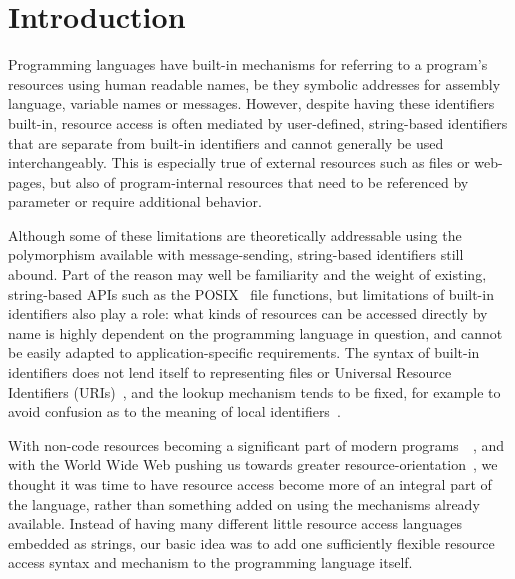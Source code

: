 \documentclass{acm_proc_article-sp}
\begin{document}



\section{Introduction}

Programming languages have built-in mechanisms for 
referring to a program's resources using human readable names, be they symbolic addresses for
assembly language, variable names or messages.   However, despite having these identifiers built-in, resource access
is often mediated by user-defined, string-based identifiers that are separate from built-in identifiers
and cannot generally be used interchangeably.  This is especially true
of external resources such as files or web-pages, but also of program-internal resources that need to
be referenced by parameter or require additional behavior.



Although some of these limitations are theoretically addressable using the polymorphism available with
message-sending, string-based identifiers still abound.
Part of the reason may well be familiarity and the weight of existing, string-based APIs such as the POSIX~\cite{IEEE:POSIX.1-90}
file functions, but
limitations of built-in identifiers also play a role:   what kinds of resources can be accessed directly by name is
highly dependent on the programming language in question, and cannot be easily 
adapted to application-specific requirements.  The syntax of built-in identifiers does not lend itself to representing
files or Universal Resource Identifiers (URIs)~\cite{rfc3986}, and the lookup mechanism tends to be fixed, for example to avoid confusion as to the
meaning of local identifiers~\cite{gabriel-lisp-identifiers}.

With non-code resources becoming a significant part of modern programs~\cite{android-resources}~\cite{ios-resources}, 
and with the World Wide Web pushing us towards greater resource-orientation~\cite{fielding-rest}, we thought it was
time to have resource access become more of an integral part of the language, rather than something added on using
the mechanisms already available.
  Instead of having many different little resource
access languages embedded as strings, our basic idea was to add one sufficiently flexible resource access syntax and
mechanism to the programming language itself.
\end{document}
